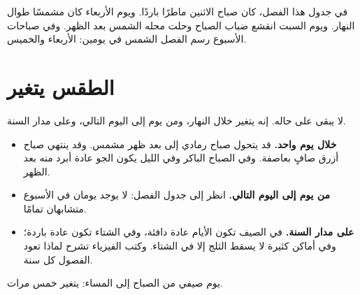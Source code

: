 \begin{example}\label{ex:g1:watching-the-weather:read}
في جدول هذا الفصل، كان صباح الاثنين ماطرًا باردًا. ويوم الأربعاء كان
مشمسًا طوال النهار. ويوم السبت انقشع ضباب الصباح وحلت محله الشمس بعد
الظهر. وفي صباحات الأسبوع رسم الفصل الشمس في يومين: الأربعاء
والخميس.
\end{example}

\section{الطقس يتغير}

لا يبقى  على حاله. إنه يتغير خلال النهار، ومن يوم إلى اليوم
التالي، وعلى مدار السنة.

\begin{itemize}
  \item \textbf{خلال يوم واحد.} قد يتحول صباح رمادي إلى بعد ظهر مشمس.
        وقد ينتهي صباح أزرق صافٍ بعاصفة. وفي الصباح الباكر وفي الليل
        يكون الجو عادة أبرد منه بعد الظهر.
  \item \textbf{من يوم إلى اليوم التالي.} انظر إلى جدول الفصل: لا يوجد
        يومان في الأسبوع متشابهان تمامًا.
  \item \textbf{على مدار السنة.} في الصيف تكون الأيام عادة دافئة، وفي
        الشتاء تكون عادة باردة؛ وفي أماكن كثيرة لا يسقط الثلج إلا في
        الشتاء. وكتب الفيزياء تشرح لماذا تعود الفصول كل
        سنة.
\end{itemize}

\begin{omfigure}

{\small يوم صيفي من الصباح إلى المساء:  يتغير خمس
مرات.}
\label{fig:g1:watching-the-weather:day}
\end{omfigure}

